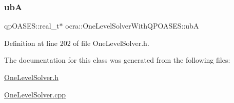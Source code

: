 \subsubsection{\texorpdfstring{ubA}{ubA}}
{\footnotesize\ttfamily qp\+O\+A\+S\+E\+S\+::real\+\_\+t$\ast$ ocra\+::\+One\+Level\+Solver\+With\+Q\+P\+O\+A\+S\+E\+S\+::ubA\hspace{0.3cm}{\ttfamily [protected]}}



Definition at line 202 of file One\+Level\+Solver.\+h.



The documentation for this class was generated from the following files\+:\begin{DoxyCompactItemize}
\item 
\hyperlink{OneLevelSolver_8h}{One\+Level\+Solver.\+h}\item 
\hyperlink{OneLevelSolver_8cpp}{One\+Level\+Solver.\+cpp}\end{DoxyCompactItemize}
